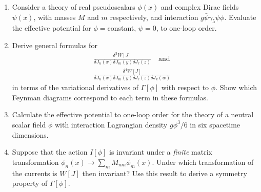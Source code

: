 

\begin{enumerate}
  \item Consider a theory of real pseudoscalars $\phi(x)$ and complex Dirac fields
  $\psi(x)$, with masses $M$ and $m$ respectively, and interaction
  $g\bar\psi\gamma_5\psi\phi$. Evaluate the effective potential for $\phi={}$constant,
  $\psi=0$, to one-loop order.

  \item Derive general formulas for
  \begin{gather*}
    \frac{\delta^3W[J]}{\delta J_n(x)\delta J_m(y)\delta J_\ell(z)}
    \quad\text{and}\quad \\
    \frac{\delta^4W[J]}{\delta J_n(x)\delta J_m(y)\delta J_\ell(z)\delta J_k(w)}
  \end{gather*}
  in terms of the variational derivatives of $\Gamma[\phi]$ with respect to $\phi$.
  Show which Feynman diagrams correspond to each term in these formulas.

  \item Calculate the effective potential to one-loop order for the theory of a
  neutral scalar field $\phi$ with interaction Lagrangian density $g\phi^3/6$ in
  six spacetime dimensions.

  \item Suppose that the action $I[\phi]$ is invariant under a \emph{finite} matrix
  transformation $\phi_n(x)\longrightarrow\sum_m M_{nm}\phi_m(x)$. Under which
  transformation of the currents is $W[J]$ then invariant? Use this result to derive
  a symmetry property of $\Gamma[\phi]$.
\end{enumerate}


